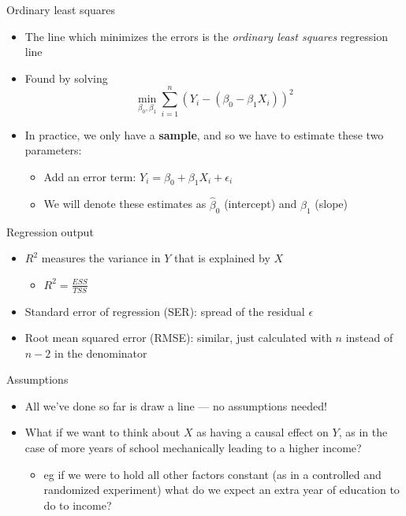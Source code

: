 \documentclass[aspectratio=169]{beamer}
\begin{document}
\begin{frame}{Ordinary least squares}
    \begin{itemize}
        \item The line which minimizes the errors is the \textit{ordinary least squares} regression line
        \item Found by solving 
        $$
        \min_{\beta_0, \beta_1} \sum_{i=1}^n (Y_i - (\beta_0 - \beta_1 X_i))^2
        $$
        \item In practice, we only have a \textbf{sample}, and so we have to estimate these two parameters:
        \begin{itemize}
            \item Add an error term: $Y_i = \beta_0 + \beta_1 X_i + \epsilon_i$
            \item We will denote these estimates as $\hat{\beta}_0$ (intercept) and $\hat{\beta}_1$ (slope)
        \end{itemize}
    \end{itemize}
\end{frame}

\begin{frame}{Regression output}
    \begin{itemize}
        \item $R^2$ measures the variance in $Y$ that is explained by $X$
        \begin{itemize}
            \item $R^2 = \frac{ESS}{TSS}$
        \end{itemize}
        \item Standard error of regression (SER): spread of the residual $\epsilon$
        \item Root mean squared error (RMSE): similar, just calculated with $n$ instead of $n-2$ in the denominator
    \end{itemize}
\end{frame}

\begin{frame}{Assumptions}
    \begin{itemize}
        \item All we've done so far is draw a line --- no assumptions needed!
        \item What if we want to think about $X$ as having a causal effect on $Y$, as in the case of more years of school mechanically leading to a higher income?
        \begin{itemize}
            \item eg if we were to hold all other factors constant (as in a controlled and randomized experiment) what do we expect an extra year of education to do to income?
        \end{itemize}
    \end{itemize}
\end{frame}
\end{document}
